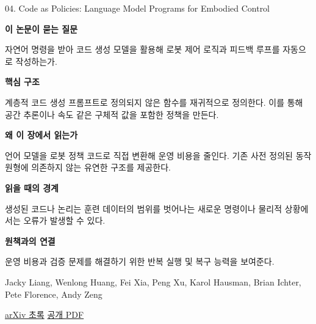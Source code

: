 \documentclass[11pt,openany]{book}
\begin{document}
\begin{termcard}{04. Code as Policies: Language Model Programs for Embodied Control}

\par

\medskip

{\sffamily\bfseries\color{deepblue} 이 논문이 묻는 질문}\par

자연어 명령을 받아 코드 생성 모델을 활용해 로봇 제어 로직과 피드백 루프를 자동으로 작성하는가.

\smallskip

{\sffamily\bfseries\color{deepblue} 핵심 구조}\par

계층적 코드 생성 프롬프트로 정의되지 않은 함수를 재귀적으로 정의한다. 이를 통해 공간 추론이나 속도 같은 구체적 값을 포함한 정책을 만든다.

\smallskip

{\sffamily\bfseries\color{deepblue} 왜 이 장에서 읽는가}\par

언어 모델을 로봇 정책 코드로 직접 변환해 운영 비용을 줄인다. 기존 사전 정의된 동작 원형에 의존하지 않는 유연한 구조를 제공한다.

\smallskip

{\sffamily\bfseries\color{coral} 읽을 때의 경계}\par

생성된 코드나 논리는 훈련 데이터의 범위를 벗어나는 새로운 명령이나 물리적 상황에서는 오류가 발생할 수 있다.

\smallskip

{\sffamily\bfseries\color{teal} 원책과의 연결}\par

운영 비용과 검증 문제를 해결하기 위한 반복 실행 및 복구 능력을 보여준다.

\medskip

{\footnotesize\color{muted} Jacky Liang, Wenlong Huang, Fei Xia, Peng Xu, Karol Hausman, Brian Ichter, Pete Florence, Andy Zeng\par

\href{https://arxiv.org/abs/2209.07753}{arXiv 초록} \quad \href{https://arxiv.org/pdf/2209.07753}{공개 PDF}\par}

\end{termcard}
\end{document}

